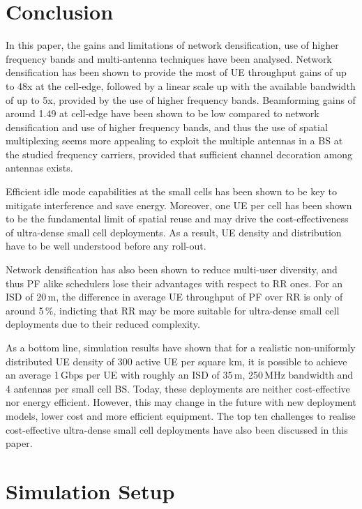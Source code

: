 \documentclass{IEEEtran}
\begin{document}
\section{Conclusion}
\label{sec:conclusion}

In this paper, the gains and limitations of network densification, use of higher frequency bands and multi-antenna techniques have been analysed.
Network densification has been shown to provide the most of UE throughput gains of up to 48x at the cell-edge,
followed by a linear scale up with the available bandwidth of up to 5x,
provided by the use of higher frequency bands.
Beamforming gains of around 1.49 at cell-edge have been shown to be low compared to network densification and use of higher frequency bands,
and thus the use of spatial multiplexing seems more appealing to exploit the multiple antennas in a \ac{BS}
at the studied frequency carriers,
provided that sufficient channel decoration among antennas exists.

Efficient idle mode capabilities at the small cells has been shown to be key to mitigate interference and save energy.
Moreover, one \ac{UE} per cell has been shown to be the fundamental limit of spatial reuse and may drive the cost-effectiveness of ultra-dense small cell deployments.
As a result, \ac{UE} density and distribution have to be well understood before any roll-out.

Network densification has also been shown to reduce multi-user diversity,
and thus \ac{PF} alike schedulers lose their advantages with respect to \ac{RR} ones.
For an \ac{ISD} of 20\,m, the difference in average \ac{UE} throughput of \ac{PF} over \ac{RR} is only of around 5\,\%,
indicting that \ac{RR} may be more suitable for ultra-dense small cell deployments due to their reduced complexity.

As a bottom line, simulation results have shown that for a realistic non-uniformly distributed UE density of 300 active \ac{UE} per square km,
it is possible to achieve an average 1\,Gbps per UE with roughly an \ac{ISD} of 35\,m, 250\,MHz bandwidth and 4 antennas per small cell \ac{BS}.
Today, these deployments are neither cost-effective nor energy efficient.
However, this may change in the future with new deployment models, lower cost and more efficient equipment.
The top ten challenges to realise cost-effective ultra-dense small cell deployments have also been discussed in this paper.

\appendix
\section{Simulation Setup}
\label{sec:appendix}
\end{document}
